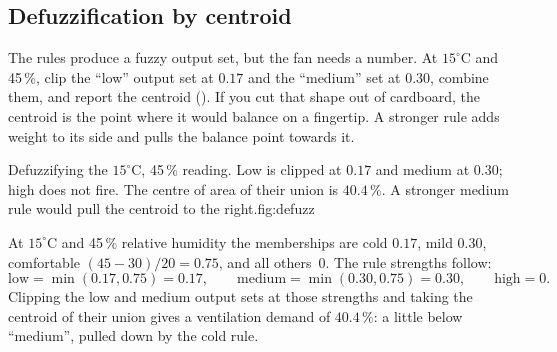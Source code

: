 \subsection{Defuzzification by centroid}

The rules produce a fuzzy output set, but the fan needs a number. At $15^\circ$C and 45\,\%, clip the ``low'' output set at $0.17$ and the ``medium'' set at $0.30$, combine them, and report the centroid (). If you cut that shape out of cardboard, the centroid is the point where it would balance on a fingertip. A stronger rule adds weight to its side and pulls the balance point towards it.

\begin{utpfig}{Defuzzifying the $15^\circ$C, 45\,\% reading. Low is clipped at $0.17$ and medium at $0.30$; high does not fire. The centre of area of their union is $40.4\,\%$. A stronger medium rule would pull the centroid to the right.}{fig:defuzz}
\end{utpfig}

\begin{workedexample}
At $15^\circ$C and 45\,\% relative humidity the memberships are cold $0.17$, mild $0.30$, comfortable $(45-30)/20=0.75$, and all others~$0$. The rule strengths follow:
\[
\text{low}=\min(0.17,0.75)=0.17,\qquad
\text{medium}=\min(0.30,0.75)=0.30,\qquad
\text{high}=0.
\]
Clipping the low and medium output sets at those strengths and taking the centroid of their union gives a ventilation demand of $40.4\,\%$: a little below ``medium'', pulled down by the cold rule.
\end{workedexample}

